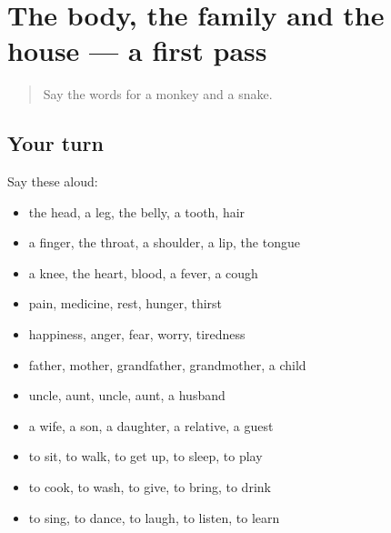 \section[(dialogue)]{The body, the family and the house — a first pass}

\label{lesson:GU-R68-first-pass-the-body-the-family-and-the-house}



\begin{quote}
Say the words for a monkey and a snake.
\end{quote}

\subsection*{Your turn}
Say these aloud:

\begin{itemize}
\raggedright
  \item the head, a leg, the belly, a tooth, hair
  \item a finger, the throat, a shoulder, a lip, the tongue
  \item a knee, the heart, blood, a fever, a cough
  \item pain, medicine, rest, hunger, thirst
  \item happiness, anger, fear, worry, tiredness
  \item father, mother, grandfather, grandmother, a child
  \item uncle, aunt, uncle, aunt, a husband
  \item a wife, a son, a daughter, a relative, a guest
  \item to sit, to walk, to get up, to sleep, to play
  \item to cook, to wash, to give, to bring, to drink
  \item to sing, to dance, to laugh, to listen, to learn
\end{itemize}

